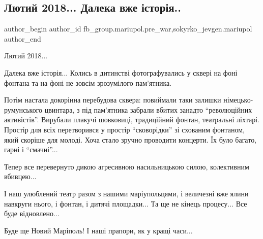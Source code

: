  
 
 
 
 

\subsection{Лютий 2018... Далека вже історія..}
\label{sec:13_02_2023.fb.fb_group.mariupol.pre_war.7.lyutii_2018__daleka_}
 
\ifcmt
 author_begin
   author_id fb_group.mariupol.pre_war,sokyrko_jevgen.mariupol
 author_end
\fi

Лютий 2018...

Далека вже історія... Колись в дитинстві фотографувались у сквері на фоні
фонтана та на фоні не зовсім зрозумілого пам'ятника. 

Потім настала докорінна перебудова сквера: повиймали таки залишки
німецько-румунського цвинтара, з під пам'ятника забрали вбитих занадто
\enquote{революційних активістів}. Вирубали плакучі шовковиці, традиційний фонтан,
театральні ліхтарі. Простір для всіх перетворився у простір \enquote{сковорідки} зі
схованим фонтаном, який скоріше для молоді. Хоча стало зручно проводити
концерти. Їх було багато, гарні і \enquote{смачні}...

Тепер все перевернуто дикою агресивною насильницькою силою, колективним
вбивцею...

І наш улюблений театр разом з нашими маріупольцями, і величезні вже ялини
навкруги нього, і фонтан, і дитячі площадки...   Та ще не кінець процесу...
Все буде відновлено...

Буде ще Новий Маріполь! І наші прапори, як у кращі часи...
